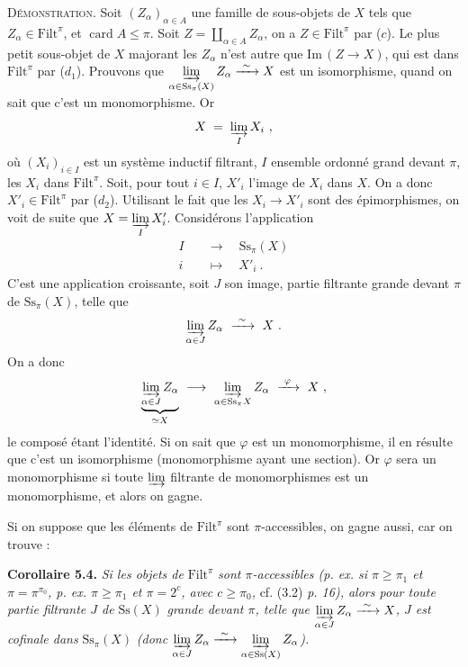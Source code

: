 \documentclass[11pt]{article}
\newcommand{\printedpage}[1]{\marginpar{\footnotesize p.~#1}}
\newcommand{\msp}[1]{\marginpar{\footnotesize [#1]}}
\newcommand{\Filt}{\mathrm{Filt}}
\newcommand{\card}{\operatorname{card}}
\newcommand{\Ss}{\mathrm{Ss}}
\newcommand{\Img}{\mathrm{Im}\,}
\newcommand{\isoto}{\xrightarrow{\ \sim\ }}
\begin{document}
\msp{page 47}
\textsc{Démonstration}. Soit $(Z_{\alpha})_{\alpha\in A}$ une famille de sous-objets de $X$ tels que $Z_{\alpha} \in \Filt^{\pi}$, et $\card A \leq \pi$. Soit $Z = \coprod_{\alpha\in A} Z_{\alpha}$, on a $Z \in \Filt^{\pi}$ par ($c$). Le plus petit sous-objet de $X$ majorant les $Z_{\alpha}$ n'est autre que $\Img (Z \longrightarrow X)$, qui est dans $\Filt^{\pi}$ par ($d_1$). Prouvons que $\varinjlim\limits_{\alpha\in\Ss_{\pi}(X)} Z_{\alpha} \isoto X$ est un isomorphisme, quand on sait que c'est un monomorphisme. Or
\[
X \;=\; \varinjlim_{I} X_i \ ,
\]
où $(X_i)_{i\in I}$ est un système inductif filtrant, $I$ ensemble ordonné grand devant $\pi$, les $X_i$ dans $\Filt^{\pi}$. Soit, pour tout $i \in I$, $X'_i$ l'image de $X_i$ dans $X$. On a donc $X'_i \in \Filt^{\pi}$ par ($d_2$). Utilisant le fait que les $X_i \longrightarrow X'_i$ sont des épimorphismes, on voit de suite que $X = \varinjlim\limits_{I} X'_i$. Considérons l'application
\[
\begin{aligned}
I \quad &\longrightarrow \quad \Ss_{\pi}(X)\\
i \quad &\longmapsto \quad X'_i \ .
\end{aligned}
\]
C'est une application croissante, soit $J$ son image, partie filtrante grande devant $\pi$ de $\Ss_{\pi}(X)$, telle que
\[
\varinjlim_{\alpha\in J} Z_{\alpha} \ \isoto \ X \ .
\]
\msp{page 48}
On a donc
\[
\underbrace{\varinjlim_{\alpha\in J} Z_{\alpha}}_{\simeq X} \ \longrightarrow \ \varinjlim_{\alpha\in\Ss_{\pi}X} Z_{\alpha} \ \xrightarrow{\ \varphi\ } \ X \ ,
\]
le composé étant l'identité. Si on sait que $\varphi$ est un monomorphisme, il en résulte que c'est un isomorphisme (monomorphisme ayant une section). Or $\varphi$ sera un monomorphisme si toute $\varinjlim$ filtrante de monomorphismes est un monomorphisme, et alors on gagne.

\printedpage{31}

Si on suppose que les éléments de $\Filt^{\pi}$ sont $\pi$-accessibles, on gagne aussi, car on trouve :

\textbf{Corollaire 5.4.} \textit{Si les objets de} $\Filt^{\pi}$ \textit{sont $\pi$-accessibles (p. ex. si $\pi \geq \pi_1$ et $\pi = \pi^{\pi_0}$, p. ex. $\pi \geq \pi_1$ et $\pi = 2^{c}$, avec $c \geq \pi_0$,} cf. (3.2) \textit{p. 16), alors pour toute partie filtrante $J$ de} $\Ss(X)$ \textit{grande devant $\pi$, telle que $\varinjlim\limits_{\alpha\in J} Z_{\alpha} \isoto X$, $J$ est cofinale dans} $\Ss_{\pi}(X)$ \textit{(donc $\varinjlim\limits_{\alpha\in J} Z_{\alpha} \isoto \varinjlim\limits_{\alpha\in\Ss(X)} Z_{\alpha}$).}
\end{document}
